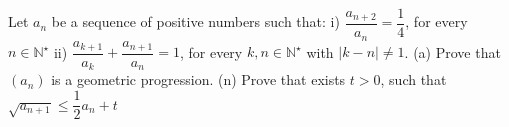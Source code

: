 Let $a_n$ be a sequence of positive numbers such that:
i) $\dfrac{a_{n+2}}{a_n}=\dfrac{1}{4}$, for every $n\in\mathbb{N}^{\star}$
ii) $\dfrac{a_{k+1}}{a_k}+\dfrac{a_{n+1}}{a_n}=1$, for every $ k,n\in\mathbb{N}^{\star}$ with $|k-n|\neq 1$.
(a) Prove that $(a_n)$ is a geometric progression.
(n) Prove that exists  $t>0$, such that $\sqrt{a_{n+1}}\leq \dfrac{1}{2}a_n+t$